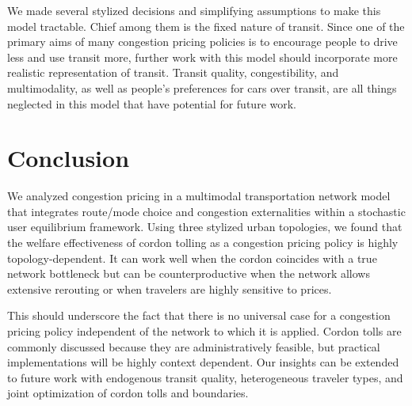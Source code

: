 \documentclass[12pt]{article}
\begin{document}
We made several stylized decisions and simplifying assumptions to make this model tractable.
Chief among them is the fixed nature of transit.
Since one of the primary aims of many congestion pricing policies is to encourage people to drive less and use transit more, further work with this model should incorporate more realistic representation of transit.
Transit quality, congestibility, and multimodality, as well as people's preferences for cars over transit, are all things neglected in this model that have potential for future work.

\section{Conclusion}

We analyzed congestion pricing in a multimodal transportation network model that integrates route/mode choice and congestion externalities within a stochastic user equilibrium framework.
Using three stylized urban topologies, we found that the welfare effectiveness of cordon tolling as a congestion pricing policy is highly topology-dependent.
It can work well when the cordon coincides with a true network bottleneck but can be counterproductive when the network allows extensive rerouting or when travelers are highly sensitive to prices.

This should underscore the fact that there is no universal case for a congestion pricing policy independent of the network to which it is applied.
Cordon tolls are commonly discussed because they are administratively feasible, but practical implementations will be highly context dependent.
Our insights can be extended to future work with endogenous transit quality, heterogeneous traveler types, and joint optimization of cordon tolls and boundaries.

\setlength{\bibsep}{0pt}


\end{document}

